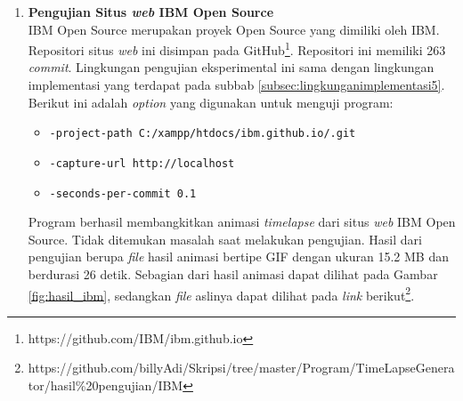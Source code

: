 \begin{enumerate}



\item \textbf{Pengujian Situs \textit{web} IBM Open Source}\\
IBM Open Source merupakan proyek Open Source yang dimiliki oleh IBM. Repositori situs \textit{web} ini disimpan pada GitHub\footnote{https://github.com/IBM/ibm.github.io}. Repositori ini memiliki 263 \textit{commit}. Lingkungan pengujian eksperimental ini sama dengan lingkungan implementasi yang terdapat pada subbab \ref{subsec:lingkunganimplementasi5}. Berikut ini adalah \textit{option} yang digunakan untuk menguji program:
\begin{itemize}
\item \texttt{-project-path C:/xampp/htdocs/ibm.github.io/.git}
\item \texttt{-capture-url http://localhost}
\item \texttt{-seconds-per-commit 0.1} 
\end{itemize}
Program berhasil membangkitkan animasi \textit{timelapse} dari situs \textit{web} IBM Open Source. Tidak ditemukan masalah saat melakukan pengujian. Hasil dari pengujian berupa \textit{file} hasil animasi bertipe GIF dengan ukuran 15.2 MB dan berdurasi 26 detik. Sebagian dari hasil animasi dapat dilihat pada Gambar \ref{fig:hasil_ibm}, sedangkan \textit{file} aslinya dapat dilihat pada \textit{link} berikut\footnote{https://github.com/billyAdi/Skripsi/tree/master/Program/TimeLapseGenerator/hasil\%20pengujian/IBM}.



\end{enumerate}
